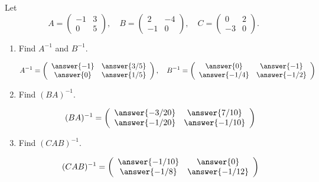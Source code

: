 \documentclass{ximera}
\author{Parisa Fatheddin}
\begin{document}
\begin{exercise}
  Let
  \[
    A= \left(
      \begin{array}{cc}
        -1 & 3   \\
        0 &  5
      \end{array}
    \right), \quad
    B= \left(
      \begin{array}{cc}
        2 & -4   \\
        -1 &  0
      \end{array}
    \right), \quad
    C = \left(
      \begin{array}{cc}
        0&2\\
        -3&0
      \end{array}
    \right).
  \]

  \begin{enumerate}
  \item Find $A^{-1}$ and $B^{-1}$.
    \begin{prompt}
      \[
        A^{-1}= \left(
          \begin{array}{cc}
            \answer{-1} & \answer{3/5}   \\
            \answer{0} & \answer{1/5}
          \end{array}
        \right), \quad
        B^{-1}= \left(
          \begin{array}{cc}
            \answer{0} & \answer{-1}   \\
            \answer{-1/4} & \answer{-1/2}
          \end{array}
        \right)
      \]
    \end{prompt}

  \item Find $(BA)^{-1}$.
    \begin{prompt}
      \[
        (BA)^{-1} = \left(
          \begin{array}{cc}
            \answer{-3/20} & \answer{7/10}   \\
            \answer{-1/20} & \answer{-1/10}
          \end{array}
        \right)
      \]
    \end{prompt}

  \item Find $(CAB)^{-1}$.
    \begin{prompt}
      \[
        (CAB)^{-1}= \left(
          \begin{array}{cc}
            \answer{-1/10} & \answer{0}   \\
            \answer{-1/8} & \answer{-1/12}
          \end{array}
        \right)
      \]
    \end{prompt}
  \end{enumerate}

\end{exercise}
\end{document}
